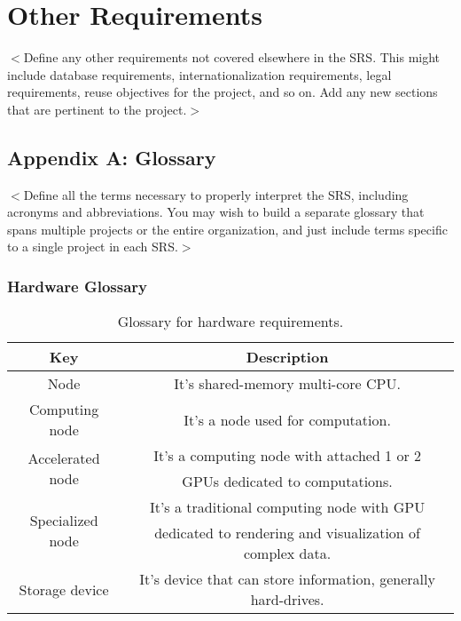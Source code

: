 \documentclass{report}
\begin{document}
\chapter{Other Requirements}
$<$Define any other requirements not covered elsewhere in the SRS. This might 
include database requirements, internationalization requirements, legal 
requirements, reuse objectives for the project, and so on. Add any new sections 
that are pertinent to the project.$>$

\section{Appendix A: Glossary}
$<$Define all the terms necessary to properly interpret the SRS, including 
acronyms and abbreviations. You may wish to build a separate glossary that spans 
multiple projects or the entire organization, and just include terms specific to 
a single project in each SRS.$>$

\subsection{Hardware Glossary} \label{app:glossary:hardware}
	\begin{table}[!htbp]
		\centering
		\caption{Glossary for hardware requirements.}
		\label{tab:hardware_requirements_glossary}
		\begin{tabular}{|c|c|}
			\hline
			\textbf{Key} & \textbf{Description} \\ \hline \hline
			Node & It's shared-memory multi-core CPU.\\ \hline
			Computing node & It's a node used for computation. \\ \hline
			\multirow{2}{*}{Accelerated node} &  It's a computing node with attached 1 or 2 \\ & GPUs dedicated to computations.\\ \hline
			\multirow{2}{*}{Specialized node} & It's a traditional computing node with GPU \\& dedicated to rendering and visualization of complex data. \\ \hline \hline
			Storage device & It's device that can store information, generally hard-drives. \\ \hline
		\end{tabular}
	\end{table}
\clearpage
\end{document}
